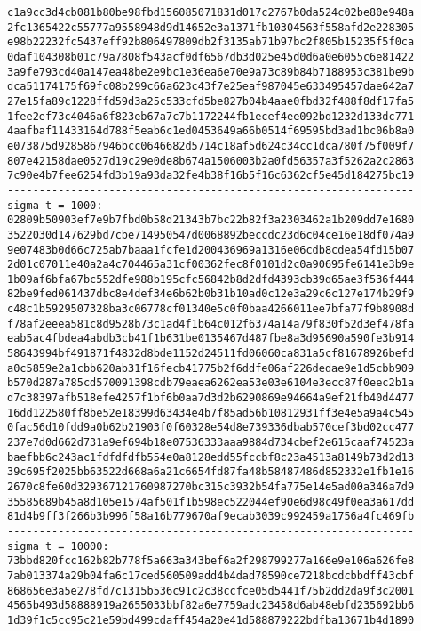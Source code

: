 \documentclass{article}
\begin{document}
{\begin{verbatim}
c1a9cc3d4cb081b80be98fbd156085071831d017c2767b0da524c02be80e948a
2fc1365422c55777a9558948d9d14652e3a1371fb10304563f558afd2e228305
e98b22232fc5437eff92b806497809db2f3135ab71b97bc2f805b15235f5f0ca
0daf104308b01c79a7808f543acf0df6567db3d025e45d0d6a0e6055c6e81422
3a9fe793cd40a147ea48be2e9bc1e36ea6e70e9a73c89b84b7188953c381be9b
dca51174175f69fc08b299c66a623c43f7e25eaf987045e633495457dae642a7
27e15fa89c1228ffd59d3a25c533cfd5be827b04b4aae0fbd32f488f8df17fa5
1fee2ef73c4046a6f823eb67a7c7b1172244fb1ecef4ee092bd1232d133dc771
4aafbaf11433164d788f5eab6c1ed0453649a66b0514f69595bd3ad1bc06b8a0
e073875d9285867946bcc0646682d5714c18af5d624c34cc1dca780f75f009f7
807e42158dae0527d19c29e0de8b674a1506003b2a0fd56357a3f5262a2c2863
7c90e4b7fee6254fd3b19a93da32fe4b38f16b5f16c6362cf5e45d184275bc19
----------------------------------------------------------------
sigma t = 1000:
02809b50903ef7e9b7fbd0b58d21343b7bc22b82f3a2303462a1b209dd7e1680
3522030d147629bd7cbe714950547d0068892beccdc23d6c04ce16e18df074a9
9e07483b0d66c725ab7baaa1fcfe1d200436969a1316e06cdb8cdea54fd15b07
2d01c07011e40a2a4c704465a31cf00362fec8f0101d2c0a90695fe6141e3b9e
1b09af6bfa67bc552dfe988b195cfc56842b8d2dfd4393cb39d65ae3f536f444
82be9fed061437dbc8e4def34e6b62b0b31b10ad0c12e3a29c6c127e174b29f9
c48c1b5929507328ba3c06778cf01340e5c0f0baa4266011ee7bfa77f9b8908d
f78af2eeea581c8d9528b73c1ad4f1b64c012f6374a14a79f830f52d3ef478fa
eab5ac4fbdea4abdb3cb41f1b631be0135467d487fbe8a3d95690a590fe3b914
58643994bf491871f4832d8bde1152d24511fd06060ca831a5cf81678926befd
a0c5859e2a1cbb620ab31f16fecb41775b2f6ddfe06af226dedae9e1d5cbb909
b570d287a785cd570091398cdb79eaea6262ea53e03e6104e3ecc87f0eec2b1a
d7c38397afb518efe4257f1bf6b0aa7d3d2b6290869e94664a9ef21fb40d4477
16dd122580ff8be52e18399d63434e4b7f85ad56b10812931ff3e4e5a9a4c545
0fac56d10fdd9a0b62b21903f0f60328e54d8e739336dbab570cef3bd02cc477
237e7d0d662d731a9ef694b18e07536333aaa9884d734cbef2e615caaf74523a
baefbb6c243ac1fdfdfdfb554e0a8128edd55fccbf8c23a4513a8149b73d2d13
39c695f2025bb63522d668a6a21c6654fd87fa48b58487486d852332e1fb1e16
2670c8fe60d329367121760987270bc315c3932b54fa775e14e5ad00a346a7d9
35585689b45a8d105e1574af501f1b598ec522044ef90e6d98c49f0ea3a617dd
81d4b9ff3f266b3b996f58a16b779670af9ecab3039c992459a1756a4fc469fb
----------------------------------------------------------------
sigma t = 10000:
73bbd820fcc162b82b778f5a663a343bef6a2f298799277a166e9e106a626fe8
7ab013374a29b04fa6c17ced560509add4b4dad78590ce7218bcdcbbdff43cbf
868656e3a5e278fd7c1315b536c91c2c38ccfce05d5441f75b2dd2da9f3c2001
4565b493d58888919a2655033bbf82a6e7759adc23458d6ab48ebfd235692bb6
1d39f1c5cc95c21e59bd499cdaff454a20e41d588879222bdfba13671b4d1890

\end{verbatim}}
\end{document}
